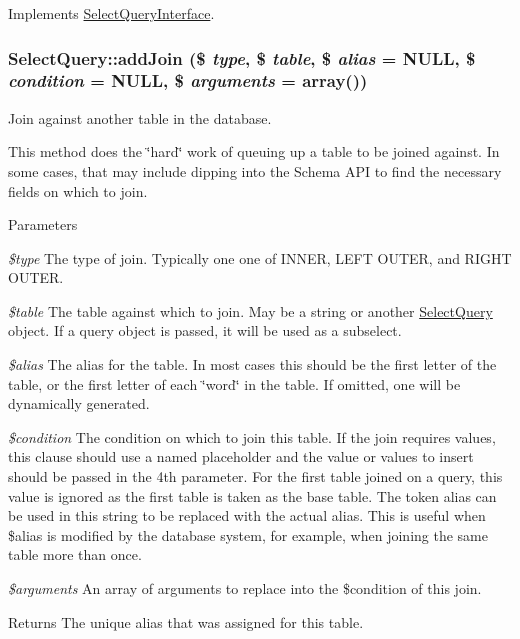 Implements \hyperlink{interfaceSelectQueryInterface_a1c8331825723867ceba20436a6ea5ed1}{SelectQueryInterface}.\hypertarget{classSelectQuery_ad4a44826400c0a880129e009cbdea2d2}{
\subsubsection[{addJoin}]{\setlength{\rightskip}{0pt plus 5cm}SelectQuery::addJoin (\$ {\em type}, \/  \$ {\em table}, \/  \$ {\em alias} = {\ttfamily NULL}, \/  \$ {\em condition} = {\ttfamily NULL}, \/  \$ {\em arguments} = {\ttfamily array()})}}
\label{classSelectQuery_ad4a44826400c0a880129e009cbdea2d2}
Join against another table in the database.

This method does the \char`\"{}hard\char`\"{} work of queuing up a table to be joined against. In some cases, that may include dipping into the Schema API to find the necessary fields on which to join.


\begin{DoxyParams}{Parameters}
\item[{\em \$type}]The type of join. Typically one one of INNER, LEFT OUTER, and RIGHT OUTER. \item[{\em \$table}]The table against which to join. May be a string or another \hyperlink{classSelectQuery}{SelectQuery} object. If a query object is passed, it will be used as a subselect. \item[{\em \$alias}]The alias for the table. In most cases this should be the first letter of the table, or the first letter of each \char`\"{}word\char`\"{} in the table. If omitted, one will be dynamically generated. \item[{\em \$condition}]The condition on which to join this table. If the join requires values, this clause should use a named placeholder and the value or values to insert should be passed in the 4th parameter. For the first table joined on a query, this value is ignored as the first table is taken as the base table. The token alias can be used in this string to be replaced with the actual alias. This is useful when \$alias is modified by the database system, for example, when joining the same table more than once. \item[{\em \$arguments}]An array of arguments to replace into the \$condition of this join. \end{DoxyParams}
\begin{DoxyReturn}{Returns}
The unique alias that was assigned for this table. 
\end{DoxyReturn}



